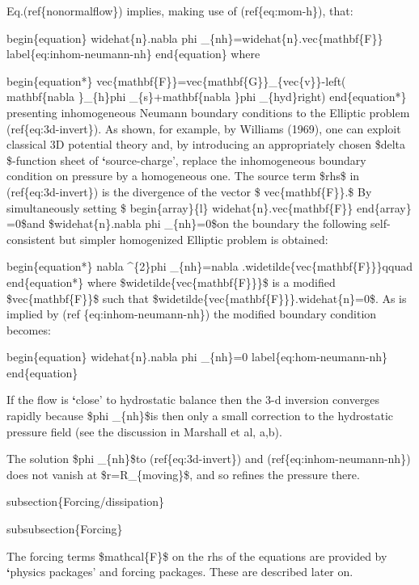 \documentclass[letterpaper,10pt,english]{sphinxmanual}
\begin{document}
Eq.(ref\{nonormalflow\}) implies, making use of (ref\{eq:mom-h\}), that:

begin\{equation\}
widehat\{n\}.nabla phi \_\{nh\}=widehat\{n\}.vec\{mathbf\{F\}\}
label\{eq:inhom-neumann-nh\}
end\{equation\}
where

begin\{equation*\}
vec\{mathbf\{F\}\}=vec\{mathbf\{G\}\}\_\{vec\{v\}\}-left( mathbf\{nabla \}\_\{h\}phi
\_\{s\}+mathbf\{nabla \}phi \_\{hyd\}right)
end\{equation*\}
presenting inhomogeneous Neumann boundary conditions to the Elliptic problem
(ref\{eq:3d-invert\}). As shown, for example, by Williams (1969), one can
exploit classical 3D potential theory and, by introducing an appropriately
chosen \$delta \$-function sheet of {\color{red}\bfseries{}{}`}source-charge', replace the
inhomogeneous boundary condition on pressure by a homogeneous one. The
source term \$rhs\$ in (ref\{eq:3d-invert\}) is the divergence of the vector \$
vec\{mathbf\{F\}\}.\$ By simultaneously setting \$
begin\{array\}\{l\}
widehat\{n\}.vec\{mathbf\{F\}\}
end\{array\}
=0\$and \$widehat\{n\}.nabla phi \_\{nh\}=0\$on the boundary the following
self-consistent but simpler homogenized Elliptic problem is obtained:

begin\{equation*\}
nabla \textasciicircum{}\{2\}phi \_\{nh\}=nabla .widetilde\{vec\{mathbf\{F\}\}\}qquad
end\{equation*\}
where \$widetilde\{vec\{mathbf\{F\}\}\}\$ is a modified \$vec\{mathbf\{F\}\}\$ such
that \$widetilde\{vec\{mathbf\{F\}\}\}.widehat\{n\}=0\$. As is implied by (ref
\{eq:inhom-neumann-nh\}) the modified boundary condition becomes:

begin\{equation\}
widehat\{n\}.nabla phi \_\{nh\}=0  label\{eq:hom-neumann-nh\}
end\{equation\}

If the flow is {\color{red}\bfseries{}{}`}close' to hydrostatic balance then the 3-d inversion
converges rapidly because \$phi \_\{nh\}\$is then only a small correction to
the hydrostatic pressure field (see the discussion in Marshall et al, a,b).

The solution \$phi \_\{nh\}\$to (ref\{eq:3d-invert\}) and (ref\{eq:inhom-neumann-nh\})
does not vanish at \$r=R\_\{moving\}\$, and so refines the pressure there.

subsection\{Forcing/dissipation\}

subsubsection\{Forcing\}

The forcing terms \$mathcal\{F\}\$ on the rhs of the equations are provided by
{\color{red}\bfseries{}{}`}physics packages' and forcing packages. These are described later on.
\end{document}
